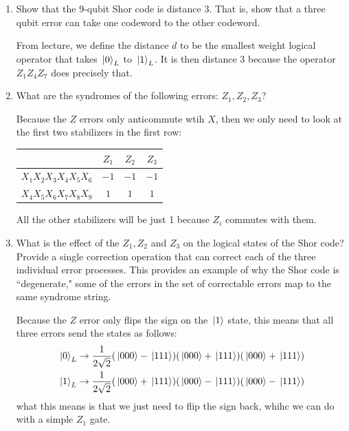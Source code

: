 \documentclass[10pt]{article}
\begin{document}
	\begin{enumerate}[label=\alph*)]
		\item Show that the 9-qubit Shor code is distance 3. That is, show that a three qubit error 
			can take one codeword to the other codeword. 

			\begin{solution}
				From lecture, we define the distance \( d \) to be the smallest weight logical operator that 
				takes \( \ket*{0}_L \) to \( \ket*{1}_L \). It is then distance 3 because the operator
				\( Z_1Z_4Z_7 \) does precisely that. 
			\end{solution}
		\item What are the syndromes of the following errors: \( Z_1, Z_2, Z_3 \)?

			\begin{solution}
				Because the \( Z \) errors only anticommute wtih \( X \), then we only need to look at the 
				first two stabilizers in the first row:
				\begin{center}
					\begin{tabular}{c|c|c|c}
						& \( Z_1 \) & \( Z_2 \) & \( Z_3 \) \\
						\hline
						\( X_1X_2X_3X_4X_5X_6 \) & \( -1 \) & \( -1 \) &\(  -1 \) \\
						\hline
						\( X_4X_5X_6X_7X_8X_9 \) & \( 1 \) &  \( 1 \) &  \( 1 \) \\
					\end{tabular}
				\end{center}
				All the other stabilizers will be just 1 because \( Z_i \) commutes with them.   
			\end{solution}
		\item What is the effect of the \( Z_1, Z_2 \) and \( Z_3 \) on the logical states of the Shor code? 
			Provide a single correction operation that can correct each of the three individual error processes. 
			This provides an example of why the Shor code is ``degenerate," some of the errors in the set of 
			correctable errors map to the same syndrome string.

			\begin{solution}
				Because the \( Z \) error only flips the sign on the \( \ket*{1} \) state, this means that 
				all three errors send the states as follows:
				\begin{align*}
					\ket*{0}_L &\to \frac{1}{2\sqrt{2} }(\ket*{000} - \ket*{111})(\ket*{000} + \ket*{111})
				(\ket*{000} + \ket*{111})\\
					\ket*{1}_L & \to \frac{1}{2\sqrt{2} }(\ket*{000} + \ket*{111})(\ket*{000} - \ket*{111})
					(\ket*{000} - \ket*{111})
			\end{align*} 
			what this means is that we just need to flip the sign back, whihc we can do with a simple \( Z_1 \) 
			gate. 
			\end{solution}
	\end{enumerate}
\end{document}
